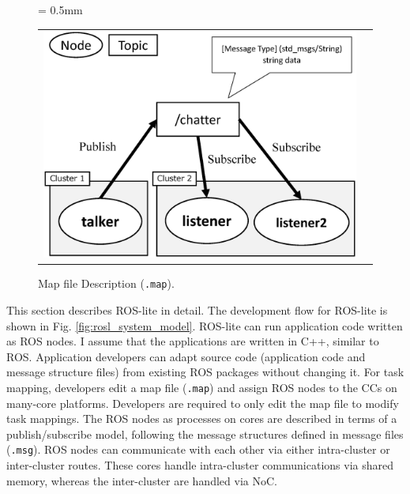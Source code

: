 \begin{figure}[thbp]
  \tabcolsep = 0.5mm              %
  \begin{tabular}{cc}
    \begin{minipage}[thbp]{0.59\textwidth}
      \centering
      \includegraphics[width=0.85\linewidth]{../figure/roslite/example.eps}
      \caption{The publish/subscribe model in ROS-lite.}
      \label{fig:rosl_example}
    \end{minipage}
    &
    \begin{minipage}[thbp]{0.39\textwidth}
      
      \caption{Map file Description (\texttt{.map}).}
      \label{code:map_file}
    \end{minipage}
  \end{tabular}
\end{figure}

This section describes ROS-lite in detail.
The development flow for ROS-lite is shown in Fig. \ref{fig:rosl_system_model}.
ROS-lite can run application code written as ROS nodes.
I assume that the applications are written in C++, similar to ROS.
Application developers can adapt source code (application code and message structure files) from existing ROS packages without changing it.
For task mapping, developers edit a map file (\texttt{.map}) and assign ROS nodes to the CCs on many-core platforms.
Developers are required to only edit the map file to modify task mappings.
The ROS nodes as processes on cores are described in terms of a publish/subscribe model, following the message structures defined in message files (\texttt{.msg}).
ROS nodes can communicate with each other via either intra-cluster or inter-cluster routes.
These cores handle intra-cluster communications via shared memory, whereas the inter-cluster are handled via NoC.

